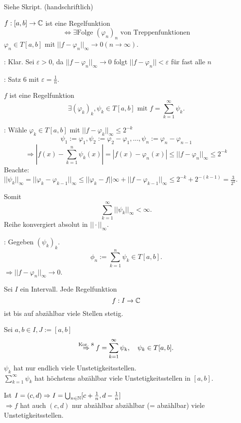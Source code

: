 \documentclass[../ana2.tex]{subfiles}
\begin{document}
\begin{bew}
    Siehe Skript. (handschriftlich)
\end{bew}
\begin{kor}
    \( f:[a,b]\rightarrow \mathbb{C} \) ist eine Regelfunktion 
    \[ \Leftrightarrow \exists \text{Folge } 
    (\varphi_n)_n \text{ von Treppenfunktionen} \]
    \( \varphi_n \in T[a,b] \) mit \( ||f-\varphi_n||_\infty 
    \rightarrow 0 (n\rightarrow \infty) \).
\end{kor}
\begin{bew}
    \gqq{\( \Leftarrow \)}: Klar. Sei \( \varepsilon > 0\), 
    da \( ||f-\varphi_n||_\infty \rightarrow 0 \) folgt 
    \( ||f-\varphi_n|| < \varepsilon \) für fast alle \(n\)
    
    \gqq{\( \Rightarrow \)}: Satz \(6\) 
    mit \( \varepsilon = \frac{1}{n} \).
\end{bew}
\begin{kor}
    \( f \) ist eine Regelfunktion
    \[ \exists (\varphi_k)_k, \psi_k \in T[a,b] 
    \text{ mit } f = \sum_{k=1}^\infty \psi_k. \]
\end{kor}
\begin{bew}
    \gqq{\( \Rightarrow \)}: Wähle \( \varphi_k \in T[a,b] \)
    mit \( ||f-\varphi_k||_\infty \leq 2^{-k} \)
    \[ \psi_1 := \varphi_1, \psi_2 := \varphi_2 - \varphi_1, 
    \ldots, \psi_n := \varphi_n - \varphi_{n-1} \]
    \[ \Rightarrow |f(x) - \sum_{k=1}^n \psi_k(x)| 
    = |f(x)-\varphi_n(x)| \leq ||f-\varphi_n||_\infty \leq 2^{-k} \]
    Beachte: \( ||\psi_k||_\infty = ||\varphi_k - \varphi_{k-1}||_\infty
    \leq ||\varphi_k-f||\infty + ||f-\varphi_{k-1}||_\infty
    \leq 2^{-k} +  2^{-(k-1)} = \frac{3}{2^k} \).

    Somit 
    \[ \sum_{k=1}^\infty ||\psi_k||_\infty < \infty. \]
    Reihe konvergiert absolut in \( ||\cdot||_\infty \).

    \gqq{\( \Leftarrow \)}: Gegeben \( (\psi_k)_k \).
    \[ \phi_n := \sum_{k=1}^n \psi_k \in T[a,b]. \]
    \( \Rightarrow ||f - \varphi_n||_\infty \rightarrow 0 \).
\end{bew}
\begin{kor}
    Sei \(I\) ein Intervall. Jede Regelfunktion 
    \[ f:I\rightarrow \mathbb{C} \]
    ist bis auf abzählbar viele Stellen stetig.
\end{kor}
\begin{bew}
    Sei \( a,b \in I, J := [a,b] \)
    \[ \overset{\text{Kor. 8}}{\Rightarrow} f 
    = \sum_{k=1}^\infty \psi_k
    , \quad \psi_k \in T[a,b]. \]
    \( \psi_k \) hat nur endlich viele 
    Unstetigkeitsstellen.\\
    \( \sum_{k=1}^\infty \psi_k \) hat höchstens abzählbar viele 
    Unstetigkeitsstellen in \( [a,b] \).
    
    Ist \( I = (c,d) \Rightarrow I 
    = \bigcup_{n\in\mathbb{N}} 
    [c + \frac{1}{n}, d - \frac{1}{n}] \) \\
    \( \Rightarrow f\) hat auch \( (c,d) \) nur abzählbar 
    abzählbar (= abzählbar) viele Unstetigkeitsstellen.
\end{bew}
\end{document}
